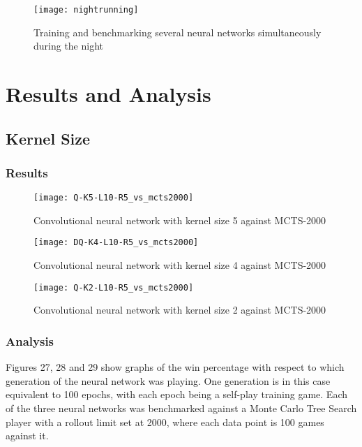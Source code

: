 \documentclass[titlepage]{article}
\begin{document}
\vskip 2cm

\begin{figure}[h]
    \center
    \texttt{[image: nightrunning]}
    \caption{Training and benchmarking several neural networks simultaneously during the night}
\end{figure}

\newpage

\section{Results and Analysis}

\subsection{Kernel Size}

\subsubsection{Results}

\vskip -0.7cm

\begin{figure}[h]
    \center
    \texttt{[image: Q-K5-L10-R5\_vs\_mcts2000]}
    \caption{Convolutional neural network with kernel size 5 against MCTS-2000}
\end{figure}

\begin{figure}[h]
    \center
    \texttt{[image: DQ-K4-L10-R5\_vs\_mcts2000]}
    \caption{Convolutional neural network with kernel size 4 against MCTS-2000}
\end{figure}

\newpage

\begin{figure}[h]
    \center
    \texttt{[image: Q-K2-L10-R5\_vs\_mcts2000]}
    \caption{Convolutional neural network with kernel size 2 against MCTS-2000}
\end{figure}

\subsubsection{Analysis}

\vskip 0.5cm

Figures 27, 28 and 29 show graphs of the win percentage with respect to which generation of the neural network was playing. One generation is in this case equivalent to 100 epochs, with each epoch being a self-play training game. Each of the three neural networks was benchmarked against a Monte Carlo Tree Search player with a rollout limit set at 2000, where each data point is 100 games against it.
\end{document}
